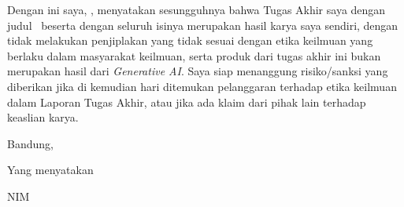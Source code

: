 Dengan ini saya, \Nama, menyatakan sesungguhnya bahwa Tugas Akhir saya dengan judul \Judul\ beserta dengan seluruh isinya merupakan hasil karya saya sendiri, dengan tidak melakukan penjiplakan yang tidak sesuai dengan etika keilmuan yang berlaku dalam masyarakat keilmuan, serta produk dari tugas akhir ini bukan merupakan hasil dari \textit{Generative AI}. Saya siap menanggung risiko/sanksi yang diberikan jika di kemudian hari ditemukan pelanggaran terhadap etika keilmuan dalam Laporan Tugas Akhir, atau jika ada klaim dari pihak lain terhadap keaslian karya.

\vspace{6pt}
\hfill\begin{minipage}{.54\textwidth}
\centering
Bandung, \TanggalPengesahan\par
Yang menyatakan\par
\vspace{2cm}
\Nama\par
NIM \NIM
\end{minipage}
